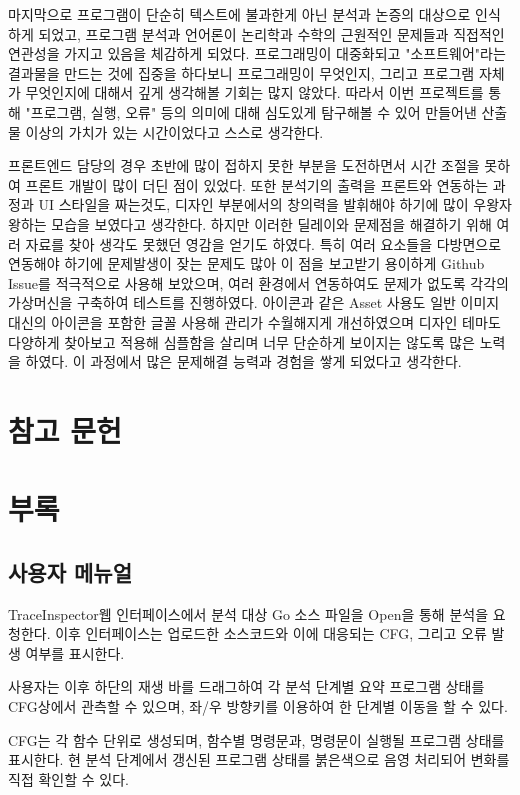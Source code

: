 \documentclass[a4paper,12pt]{article}
\newcommand{\traceinspector}{\textsf{TraceInspector}}
\begin{document}
마지막으로 프로그램이 단순히 텍스트에 불과한게 아닌 분석과 논증의 대상으로 인식하게 되었고, 프로그램 분석과 언어론이 논리학과 수학의 근원적인 문제들과 직접적인 연관성을 가지고 있음을 체감하게 되었다.
프로그래밍이 대중화되고 "소프트웨어"라는 결과물을 만드는 것에 집중을 하다보니 프로그래밍이 무엇인지, 그리고 프로그램 자체가 무엇인지에 대해서 깊게 생각해볼 기회는 많지 않았다.
따라서 이번 프로젝트를 통해 "프로그램, 실행, 오류" 등의 의미에 대해 심도있게 탐구해볼 수 있어 만들어낸 산출물 이상의 가치가 있는 시간이었다고 스스로 생각한다.

프론트엔드 담당의 경우 초반에 많이 접하지 못한 부분을 도전하면서 시간 조절을 못하여 프론트 개발이 많이 더딘 점이 있었다. 
또한 분석기의 출력을 프론트와 연동하는 과정과 UI 스타일을 짜는것도, 디자인 부분에서의 창의력을 발휘해야 하기에 많이 우왕자왕하는 모습을 보였다고 생각한다. 
하지만 이러한 딜레이와 문제점을 해결하기 위해 여러 자료를 찾아 생각도 못했던 영감을 얻기도 하였다. 
특히 여러 요소들을 다방면으로 연동해야 하기에 문제발생이 잦는 문제도 많아 이 점을 보고받기 용이하게 Github Issue를 적극적으로 사용해 보았으며, 여러 환경에서 연동하여도 문제가 없도록 각각의 가상머신을 구축하여 테스트를 진행하였다. 
아이콘과 같은 Asset 사용도 일반 이미지 대신의 아이콘을 포함한 글꼴 사용해 관리가 수월해지게 개선하였으며 디자인 테마도 다양하게 찾아보고 적용해 심플함을 살리며 너무 단순하게 보이지는 않도록 많은 노력을 하였다. 
이 과정에서 많은 문제해결 능력과 경험을 쌓게 되었다고 생각한다.

\section{참고 문헌}



\section{부록}
\subsection{사용자 메뉴얼}

\traceinspector 웹 인터페이스에서 분석 대상 Go 소스 파일을 Open을 통해 분석을 요청한다. 이후 인터페이스는 업로드한 소스코드와 이에 대응되는 CFG, 그리고 오류 발생 여부를 표시한다.

사용자는 이후 하단의 재생 바를 드래그하여 각 분석 단계별 요약 프로그램 상태를 CFG상에서 관측할 수 있으며, 좌/우 방향키를 이용하여 한 단계별 이동을 할 수 있다.

CFG는 각 함수 단위로 생성되며, 함수별 명령문과, 명령문이 실행될 프로그램 상태를 표시한다. 현 분석 단계에서 갱신된 프로그램 상태를 붉은색으로 음영 처리되어 변화를 직접 확인할 수 있다.
\end{document}
